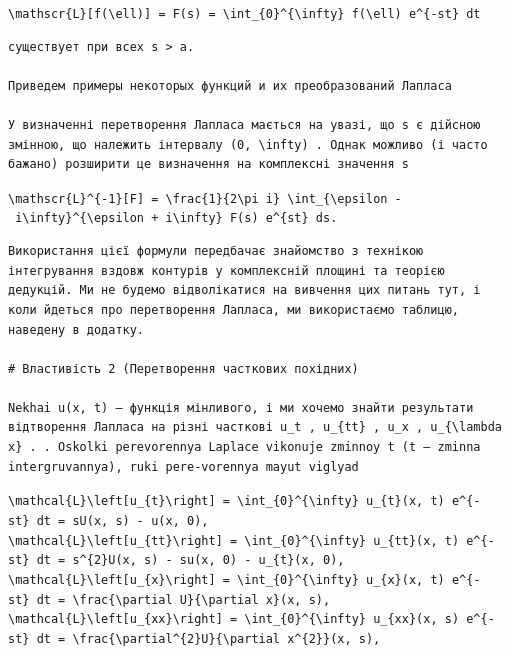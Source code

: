 \documentclass[
  ukrainian,
]{article}
\begin{document}
\texttt{\textbackslash{}mathscr\{L\}{[}f(\textbackslash{}ell){]}\ =\ F(s)\ =\ \textbackslash{}int\_\{0\}\^{}\{\textbackslash{}infty\}\ f(\textbackslash{}ell)\ e\^{}\{-st\}\ dt}

\begin{verbatim}
существует при всех s > a.

Приведем примеры некоторых функций и их преобразований Лапласа

У визначенні перетворення Лапласа мається на увазі, що s є дійсною змінною, що належить інтервалу (0, \infty) . Однак можливо (і часто бажано) розширити це визначення на комплексні значення s
\end{verbatim}

\texttt{\textbackslash{}mathscr\{L\}\^{}\{-1\}{[}F{]}\ =\ \textbackslash{}frac\{1\}\{2\textbackslash{}pi\ i\}\ \textbackslash{}int\_\{\textbackslash{}epsilon\ -\ i\textbackslash{}infty\}\^{}\{\textbackslash{}epsilon\ +\ i\textbackslash{}infty\}\ F(s)\ e\^{}\{st\}\ ds.}

\begin{verbatim}
Використання цієї формули передбачає знайомство з технікою інтегрування вздовж контурів у комплексній площині та теорією дедукцій. Ми не будемо відволікатися на вивчення цих питань тут, і коли йдеться про перетворення Лапласа, ми використаємо таблицю, наведену в додатку.

# Властивість 2 (Перетворення часткових похідних)

Nekhai u(x, t) — функція мінливого, і ми хочемо знайти результати відтворення Лапласа на різні часткові u_t , u_{tt} , u_x , u_{\lambda x} . . Oskolki perevorennya Laplace vikonuje zminnoy t (t — zminna intergruvannya), ruki pere-vorennya mayut viglyad
\end{verbatim}

\texttt{\textbackslash{}mathcal\{L\}\textbackslash{}left{[}u\_\{t\}\textbackslash{}right{]}\ =\ \textbackslash{}int\_\{0\}\^{}\{\textbackslash{}infty\}\ u\_\{t\}(x,\ t)\ e\^{}\{-st\}\ dt\ =\ sU(x,\ s)\ -\ u(x,\ 0),}
\texttt{\textbackslash{}mathcal\{L\}\textbackslash{}left{[}u\_\{tt\}\textbackslash{}right{]}\ =\ \textbackslash{}int\_\{0\}\^{}\{\textbackslash{}infty\}\ u\_\{tt\}(x,\ t)\ e\^{}\{-st\}\ dt\ =\ s\^{}\{2\}U(x,\ s)\ -\ su(x,\ 0)\ -\ u\_\{t\}(x,\ 0),}
\texttt{\textbackslash{}mathcal\{L\}\textbackslash{}left{[}u\_\{x\}\textbackslash{}right{]}\ =\ \textbackslash{}int\_\{0\}\^{}\{\textbackslash{}infty\}\ u\_\{x\}(x,\ t)\ e\^{}\{-st\}\ dt\ =\ \textbackslash{}frac\{\textbackslash{}partial\ U\}\{\textbackslash{}partial\ x\}(x,\ s),}
\texttt{\textbackslash{}mathcal\{L\}\textbackslash{}left{[}u\_\{xx\}\textbackslash{}right{]}\ =\ \textbackslash{}int\_\{0\}\^{}\{\textbackslash{}infty\}\ u\_\{xx\}(x,\ s)\ e\^{}\{-st\}\ dt\ =\ \textbackslash{}frac\{\textbackslash{}partial\^{}\{2\}U\}\{\textbackslash{}partial\ x\^{}\{2\}\}(x,\ s),}
\end{document}
